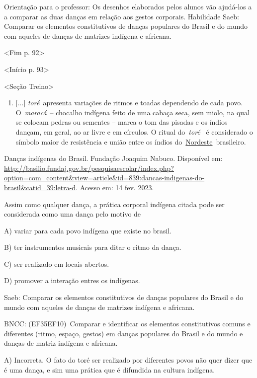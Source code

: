 Orientação para o professor: Os desenhos elaborados pelos alunos vão
ajudá-los a a comparar as duas danças em relação aos gestos corporais.
Habilidade Saeb: Comparar os elementos constitutivos de danças populares
do Brasil e do mundo com aqueles de danças de matrizes indígena e
africana.

\textless{}Fim p. 92\textgreater{}

\textless{}Início p. 93\textgreater{}

\textless{}Seção Treino\textgreater{}

\begin{enumerate}
\def\labelenumi{\arabic{enumi}.}
\item
  {[}...{]} \emph{toré}~apresenta variações de ritmos e toadas
  dependendo de cada povo. O~\emph{maracá}~-- chocalho indígena feito de
  uma cabaça seca, sem miolo, na qual se colocam pedras ou sementes --
  marca o tom das pisadas e os índios dançam, em geral, ao ar livre e em
  círculos. O ritual do~\emph{toré}~ é considerado o símbolo maior de
  resistência e união entre os índios
  do~\href{http://basilio.fundaj.gov.br/pesquisaescolar/index.php?option=com_content\&view=article\&id=197\&Itemid=193}{Nordeste}~brasileiro.
\end{enumerate}

Danças indígenas do Brasil. Fundação Joaquim Nabuco. Disponível em:
\url{http://basilio.fundaj.gov.br/pesquisaescolar/index.php?option=com_content\&view=article\&id=839:dancas-indigenas-do-brasil\&catid=39:letra-d}.
Acesso em: 14 fev. 2023.

Assim como qualquer dança, a prática corporal indígena citada pode ser
considerada como uma dança pelo motivo de

A) variar para cada povo indígena que existe no brasil.

B) ter instrumentos musicais para ditar o ritmo da dança.

C) ser realizado em locais abertos.

D) promover a interação entres os indígenas.

Saeb: Comparar os elementos constitutivos de danças populares do Brasil
e do mundo com aqueles de danças de matrizes indígena e africana.

BNCC: (EF35EF10)~Comparar e identificar os elementos constitutivos
comuns e diferentes (ritmo, espaço, gestos) em danças populares do
Brasil e do mundo e danças de matriz indígena e africana.

A) Incorreta. O fato do toré ser realizado por diferentes povos não quer
dizer que é uma dança, e sim uma prática que é difundida na cultura
indígena.

